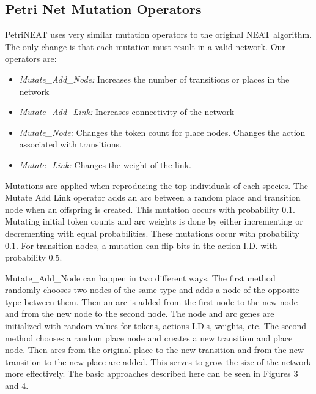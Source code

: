 \documentclass[12pt,a4paper,twocolumn]{article}
\begin{document}
\subsection{Petri Net Mutation Operators}
\label{subsec:mutationOperators}
PetriNEAT uses very similar mutation operators to the original NEAT algorithm. The only change is that each mutation must result in a valid network. Our operators are:
\begin{itemize}
\item \emph{Mutate{\_}Add{\_}Node:} Increases the number of transitions or places in the network
\item \emph{Mutate{\_}Add{\_}Link:}  Increases connectivity of the network
\item \emph{Mutate{\_}Node:}  Changes the token count for place nodes. Changes the action associated with transitions.
\item \emph{Mutate{\_}Link:} Changes the weight of the link.
\end{itemize}

Mutations are applied when reproducing the top individuals of each species. The Mutate Add Link operator adds an arc between a random place and transition node when an offspring is created. This mutation occurs with probability 0.1. Mutating initial token counts and arc weights is done by either incrementing or decrementing with equal probabilities. These mutations occur with probability 0.1. For transition nodes, a mutation can flip bits in the action I.D. with probability 0.5. 

Mutate{\_}Add{\_}Node can happen in two different ways. The first method randomly chooses two nodes of the same type and adds a node of the opposite type between them. Then an arc is added from the first node to the new node and from the new node to the second node. The node and arc genes are initialized with random values for tokens, actions I.D.s, weights, etc. The second method chooses a random place node and creates a new transition and place node. Then arcs from the original place to the new transition and from the new transition to the new place are added. This serves to grow the size of the network more effectively. The basic approaches described here can be seen in Figures 3 and 4.
\end{document}
